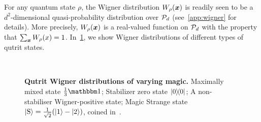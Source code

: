 \documentclass[pra,
aps,
twocolumn,
superscriptaddress,
groupedaddress,
nofootinbib,
reprint
]{revtex4-1}
\begin{document}
For any quantum state $\rho$, the Wigner distribution $W_\rho(\bmx)$ is readily seen to be a $d^2$-dimensional quasi-probability distribution over $\cal{P}_d$ (see~\cref{app:wigner} for details). More precisely, $W_\rho(\x)$ is a real-valued function on $\P_d$ with the property that $\sum_{\x} W_\rho(x) = 1$.  In~\cref{fig:wstate_examples}, we show Wigner distributions of different types of qutrit states.

\begin{figure}%
    \centering
    \hspace{8pt}%
    \\
    \hspace{8pt}%
    \caption{\textbf{Qutrit Wigner distributions of varying magic.} 
     Maximally mixed state $\frac{1}{3}\id$;  Stabilizer zero state $\ketbra{0}{0}$;  A non-stabiliser Wigner-positive state;  Magic Strange state $\ket{{\rm{S}}} = \frac{1}{\sqrt{2}}(\ket{1} - \ket{2})$, coined in~\cite{cit:veitch2}.
    }%
    \label{fig:wstate_examples}
\end{figure}
\end{document}
